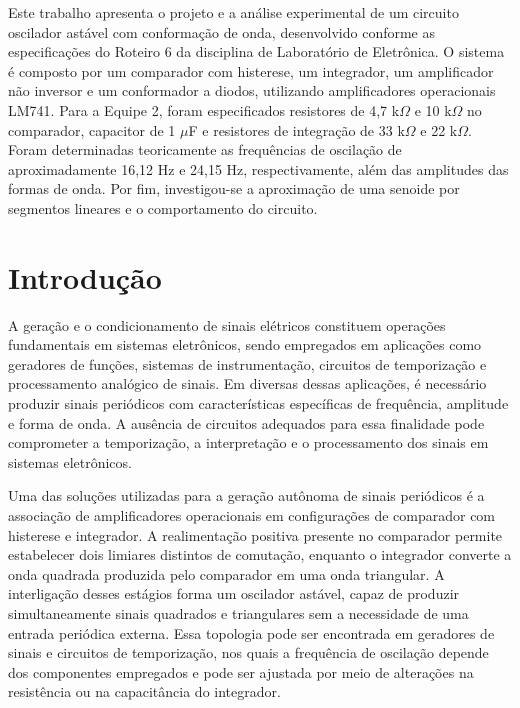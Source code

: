 \documentclass[11pt,a4paper]{article}
\begin{document}
\capa

\begin{resumo}
Este trabalho apresenta o projeto e a análise experimental de um circuito oscilador astável com conformação de onda, desenvolvido conforme as especificações do Roteiro 6 da disciplina de Laboratório de Eletrônica. O sistema é composto por um comparador com histerese, um integrador, um amplificador não inversor e um conformador a diodos, utilizando amplificadores operacionais LM741. Para a Equipe 2, foram especificados resistores de 4,7 k$\Omega$ e 10 k$\Omega$ no comparador, capacitor de 1 $\mu$F e resistores de integração de 33 k$\Omega$ e 22 k$\Omega$. Foram determinadas teoricamente as frequências de oscilação de aproximadamente 16,12 Hz e 24,15 Hz, respectivamente, além das amplitudes das formas de onda. Por fim, investigou-se a aproximação de uma senoide por segmentos lineares e o comportamento do circuito.
\end{resumo}

\section{Introdução}

A geração e o condicionamento de sinais elétricos constituem operações fundamentais em sistemas eletrônicos, sendo empregados em aplicações como geradores de funções, sistemas de instrumentação, circuitos de temporização e processamento analógico de sinais. Em diversas dessas aplicações, é necessário produzir sinais periódicos com características específicas de frequência, amplitude e forma de onda. A ausência de circuitos adequados para essa finalidade pode comprometer a temporização, a interpretação e o processamento dos sinais em sistemas eletrônicos.

Uma das soluções utilizadas para a geração autônoma de sinais periódicos é a associação de amplificadores operacionais em configurações de comparador com histerese e integrador. A realimentação positiva presente no comparador permite estabelecer dois limiares distintos de comutação, enquanto o integrador converte a onda quadrada produzida pelo comparador em uma onda triangular. A interligação desses estágios forma um oscilador astável, capaz de produzir simultaneamente sinais quadrados e triangulares sem a necessidade de uma entrada periódica externa. Essa topologia pode ser encontrada em geradores de sinais e circuitos de temporização, nos quais a frequência de oscilação depende dos componentes empregados e pode ser ajustada por meio de alterações na resistência ou na capacitância do integrador.
\end{document}
